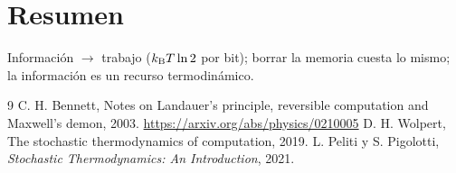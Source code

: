 \documentclass[11pt,a4paper]{article}
\begin{document}
\section{Resumen}
Información $\to$ trabajo ($k_{\mathrm B} T\ln2$ por bit); borrar la memoria cuesta lo mismo; la información es un recurso termodinámico.

\begin{thebibliography}{9}\small
{} C. H. Bennett, Notes on Landauer's principle, reversible computation and Maxwell's demon, 2003. \url{https://arxiv.org/abs/physics/0210005}
 D. H. Wolpert, The stochastic thermodynamics of computation, 2019.
 L. Peliti y S. Pigolotti, \emph{Stochastic Thermodynamics: An Introduction}, 2021.
\end{thebibliography}
\end{document}
